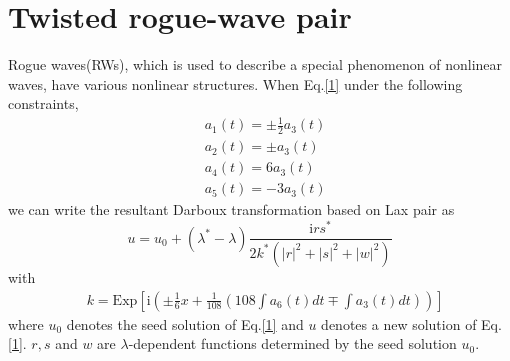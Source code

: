 \documentclass[12pt]{article}
\begin{document}
\section{Twisted rogue-wave pair}
Rogue waves(RWs), which is used to describe a special phenomenon of nonlinear waves, have various nonlinear structures\cite{1,2,11,12,13}. When Eq.\eqref{1} under the following constraints,
\begin{align}
  & a_{1}(t) = \pm\frac{1}{2}a_{3}(t) \\
  & a_{2}(t) = \pm a_{3}(t) \\
  & a_{4}(t) = 6a_{3}(t) \\
  & a_{5}(t) = -3a_{3}(t)
\end{align}
we can write the resultant Darboux transformation based on Lax pair as
\begin{equation}\label{56}
  u = u_{0} + (\lambda^{*}-\lambda)\frac{\mathrm{i}rs^{*}}{2k^{*}(|r|^{2}+|s|^{2}+|w|^{2})}
\end{equation}
with
\begin{align}
  & k=\mathrm{Exp}\left[\mathrm{i}\left(\pm \frac{1}{6}x + \frac{1}{108}\left(108\int a_{6}(t)dt \mp \int a_{3}(t)dt\right)\right)\right]
\end{align}
where $u_{0}$ denotes the seed solution of Eq.\eqref{1} and $u$ denotes a new solution of Eq.\eqref{1}. $r, s$ and $w$ are $\lambda$-dependent functions determined by the seed solution $u_{0}$.
\end{document}
